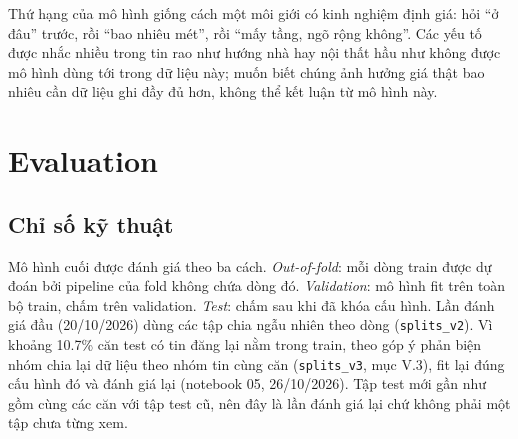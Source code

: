 \documentclass[11pt]{article}
\begin{document}
\begin{notebox}
Thứ hạng của mô hình giống cách một môi giới có kinh nghiệm định giá: hỏi ``ở đâu'' trước, rồi ``bao nhiêu
mét'', rồi ``mấy tầng, ngõ rộng không''. Các yếu tố được nhắc nhiều trong tin rao như hướng nhà hay nội thất
hầu như không được mô hình dùng tới trong dữ liệu này; muốn biết chúng ảnh hưởng giá thật bao nhiêu cần dữ liệu
ghi đầy đủ hơn, không thể kết luận từ mô hình này.
\end{notebox}

\section{Evaluation}

\subsection{Chỉ số kỹ thuật}

Mô hình cuối được đánh giá theo ba cách. \textit{Out-of-fold}: mỗi dòng train được dự đoán bởi pipeline của fold
không chứa dòng đó. \textit{Validation}: mô hình fit trên toàn bộ train, chấm trên validation. \textit{Test}: chấm sau
khi đã khóa cấu hình. Lần đánh giá đầu (20/10/2026) dùng các tập chia ngẫu nhiên theo dòng (\texttt{splits\_v2}). Vì
khoảng 10.7\% căn test có tin đăng lại nằm trong train, theo góp ý phản biện nhóm chia lại dữ liệu theo nhóm tin cùng
căn (\texttt{splits\_v3}, mục V.3), fit lại đúng cấu hình đó và đánh giá lại (notebook 05, 26/10/2026). Tập test mới
gần như gồm cùng các căn với tập test cũ, nên đây là lần đánh giá lại chứ không phải một tập chưa từng xem.
\end{document}
